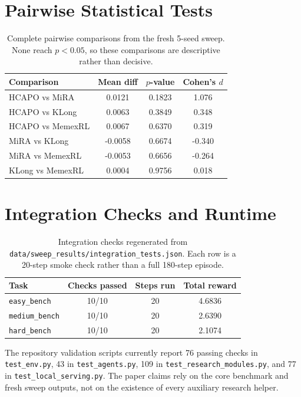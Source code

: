 \documentclass{article}
\begin{document}
\appendix

\section{Pairwise Statistical Tests}

\begin{table}[h]
  \centering
  \caption{Complete pairwise comparisons from the fresh 5-seed sweep. None reach $p < 0.05$, so these comparisons are descriptive rather than decisive.}
  \label{tab:pairwise}
  \begin{tabular}{lccc}
    \toprule
    Comparison & Mean diff & $p$-value & Cohen's $d$ \\
    \midrule
    HCAPO vs MiRA & 0.0121 & 0.1823 & 1.076 \\
    HCAPO vs KLong & 0.0063 & 0.3849 & 0.348 \\
    HCAPO vs MemexRL & 0.0067 & 0.6370 & 0.319 \\
    MiRA vs KLong & -0.0058 & 0.6674 & -0.340 \\
    MiRA vs MemexRL & -0.0053 & 0.6656 & -0.264 \\
    KLong vs MemexRL & 0.0004 & 0.9756 & 0.018 \\
    \bottomrule
  \end{tabular}
\end{table}

\section{Integration Checks and Runtime}

\begin{table}[h]
  \centering
  \caption{Integration checks regenerated from \texttt{data/sweep\_results/integration\_tests.json}. Each row is a 20-step smoke check rather than a full 180-step episode.}
  \label{tab:integration}
  \begin{tabular}{lccc}
    \toprule
    Task & Checks passed & Steps run & Total reward \\
    \midrule
    \texttt{easy\_bench} & 10/10 & 20 & 4.6836 \\
    \texttt{medium\_bench} & 10/10 & 20 & 2.6390 \\
    \texttt{hard\_bench} & 10/10 & 20 & 2.1074 \\
    \bottomrule
  \end{tabular}
\end{table}

The repository validation scripts currently report 76 passing checks in \texttt{test\_env.py}, 43 in \texttt{test\_agents.py}, 109 in \texttt{test\_research\_modules.py}, and 77 in \texttt{test\_local\_serving.py}. The paper claims rely on the core benchmark and fresh sweep outputs, not on the existence of every auxiliary research helper.

\newpage

\end{document}
